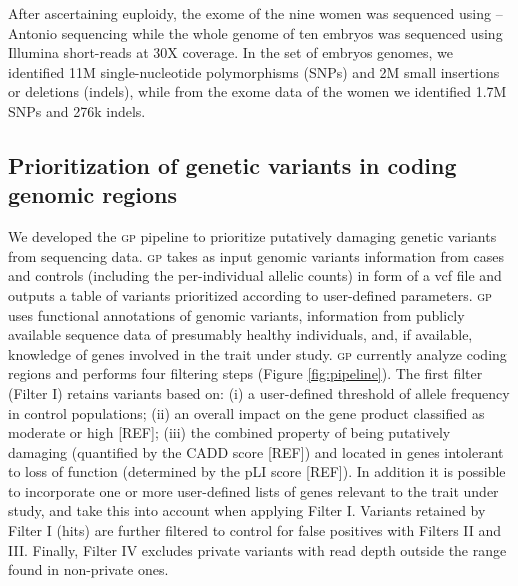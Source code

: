 \documentclass[fleqn,10pt]{wlscirep}
\newcommand{\gp}[]{\textsc{gp }}
\begin{document}
After ascertaining euploidy, the exome of the nine women was sequenced using {\color{blue}--Antonio sequencing} while the whole genome of ten embryos was sequenced using Illumina short-reads at 30X coverage. In the set of embryos genomes, we identified 11M single-nucleotide polymorphisms (SNPs) and 2M small insertions or deletions (indels), while from the exome data of the women we identified 1.7M SNPs and 276k indels.






\subsection*{Prioritization of genetic variants in coding genomic regions} 
We developed the \gp pipeline to prioritize putatively damaging genetic variants from sequencing data. \gp takes as input genomic variants information from cases and controls (including the per-individual allelic counts) in form of a vcf file and outputs a table of variants prioritized according to user-defined parameters. \gp uses functional annotations of genomic variants, information from publicly available sequence data of presumably healthy individuals, and, if available, knowledge of genes involved in the trait under study. \gp currently analyze coding regions and performs four filtering steps (Figure \ref{fig:pipeline}). The first filter (Filter I) retains variants based on: (i) a user-defined threshold of allele frequency in control populations; (ii) an overall impact on the gene product classified as moderate or high [REF]; (iii) the combined property of being putatively damaging (quantified by the CADD score [REF]) and located in genes intolerant to loss of function (determined by the pLI score [REF]). In addition it is possible to incorporate one or more user-defined lists of genes relevant to the trait under study, and take this into account when applying Filter I. Variants retained by Filter I (hits) are further filtered to control for false positives with Filters II and III. Finally, Filter IV excludes private variants with read depth outside the range found in non-private ones.   
\end{document}
